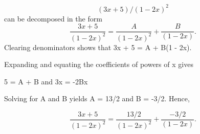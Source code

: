 \begin{frame}
\[(3x + 5)/(1 - 2x)^2\] can be decomposed in the form
\[ \frac{3x + 5}{(1-2x)^2} = \frac{A}{(1-2x)^2} + \frac{B}{(1-2x)}. \]
Clearing denominators shows that 3x + 5 = A + B(1 - 2x). 

\end{frame}
\begin{frame}
Expanding and equating the coefficients of powers of x gives

5 = A + B and 3x = -2Bx

Solving for A and B yields A = 13/2 and B = -3/2. Hence,


\[  \frac{3x + 5}{(1-2x)^2} = \frac{13/2}{(1-2x)^2} + \frac{-3/2}{(1-2x)}. \]
\end{frame}






